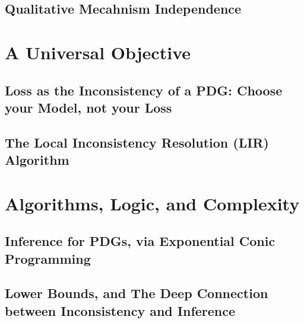\documentclass[tocprelim,
    ]{cornellmodified}
\begin{document}
\chapter{Qualitative Mecahnism Independence}
    

\part{A Universal Objective} \label{part:univ-objective}

\chapter{Loss as the Inconsistency of a PDG: 
    Choose your Model, not your Loss}
    
\chapter{ The Local Inconsistency Resolution (LIR) Algorithm }
    
    
\part{Algorithms, Logic, and Complexity%
    } \label{part:algo-logic-complexity}

\chapter{Inference for PDGs, via Exponential Conic Programming}
    

\chapter[Lower Bounds, and the Deep Connection\texorpdfstring{\\}{}between Inconsistency and Inference]%
    {Lower Bounds, and The Deep Connection between Inconsistency and Inference}
    
\end{document}
